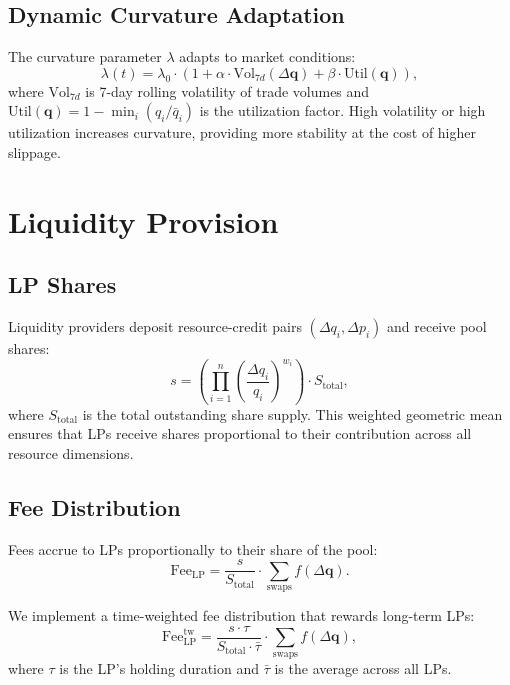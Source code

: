 \documentclass[11pt,twocolumn]{article}
\begin{document}
\subsection{Dynamic Curvature Adaptation}

The curvature parameter $\lambda$ adapts to market conditions:
\begin{equation}
\lambda(t) = \lambda_0 \cdot \left(1 + \alpha \cdot \text{Vol}_{7d}(\Delta\bm{q}) + \beta \cdot \text{Util}(\bm{q})\right),
\end{equation}
where $\text{Vol}_{7d}$ is 7-day rolling volatility of trade volumes and $\text{Util}(\bm{q}) = 1 - \min_i(q_i / \bar{q}_i)$ is the utilization factor. High volatility or high utilization increases curvature, providing more stability at the cost of higher slippage.

\section{Liquidity Provision}
\label{sec:liquidity}

\subsection{LP Shares}

Liquidity providers deposit resource-credit pairs $(\Delta q_i, \Delta p_i)$ and receive pool shares:
\begin{equation}
s = \left(\prod_{i=1}^n \left(\frac{\Delta q_i}{q_i}\right)^{w_i}\right) \cdot S_{\text{total}},
\end{equation}
where $S_{\text{total}}$ is the total outstanding share supply. This weighted geometric mean ensures that LPs receive shares proportional to their contribution across all resource dimensions.

\subsection{Fee Distribution}

Fees accrue to LPs proportionally to their share of the pool:
\begin{equation}
\text{Fee}_{\text{LP}} = \frac{s}{S_{\text{total}}} \cdot \sum_{\text{swaps}} f(\Delta\bm{q}).
\end{equation}

We implement a time-weighted fee distribution that rewards long-term LPs:
\begin{equation}
\text{Fee}_{\text{LP}}^{\text{tw}} = \frac{s \cdot \tau}{S_{\text{total}} \cdot \bar{\tau}} \cdot \sum_{\text{swaps}} f(\Delta\bm{q}),
\end{equation}
where $\tau$ is the LP's holding duration and $\bar{\tau}$ is the average across all LPs.
\end{document}
